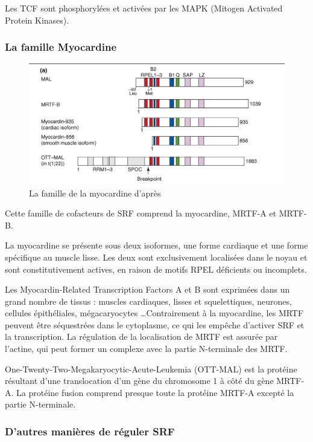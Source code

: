 Les TCF sont phosphorylées et activées par les MAPK (Mitogen Activated Protein Kinases). 


\subsubsection{La famille Myocardine}

\begin{figure}[h!]
\includegraphics[scale=0.5]{MRTF_famille.png}
\caption{La famille de la myocardine d'après \cite{posern_actin_2006}}
\end{figure}
Cette famille de cofacteurs de SRF comprend la myocardine, MRTF-A et MRTF-B.

La myocardine se présente sous deux isoformes, une forme cardiaque et une forme spécifique au muscle lisse. Les deux sont exclusivement localisées dans le noyau et sont constitutivement actives, en raison de motifs RPEL déficients ou incomplets. 

Les Myocardin-Related Transcription Factors A et B sont exprimées dans un grand nombre de tissus : muscles cardiaques, lisses et squelettiques, neurones, cellules épithéliales, mégacaryocytes \dots Contrairement à la myocardine, les MRTF peuvent être séquestrées dans le cytoplasme, ce qui les empêche d'activer SRF et la transcription. La régulation de la localisation de MRTF est assurée par l'actine, qui peut former un complexe avec la partie N-terminale des MRTF. 

One-Twenty-Two-Megakaryocytic-Acute-Leukemia (OTT-MAL) est la protéine résultant d'une translocation d'un gène du chromosome 1 à côté du gène MRTF-A. La protéine fusion comprend presque toute la protéine MRTF-A excepté la partie N-terminale. 

\subsubsection{D'autres manières de réguler SRF}

